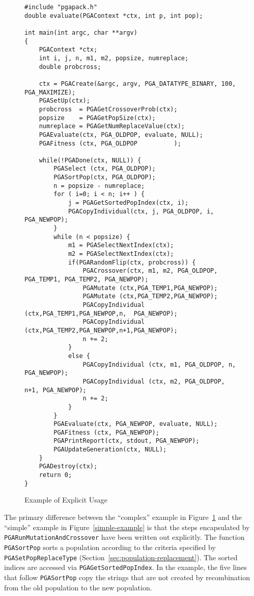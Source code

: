 \documentclass{report}
\begin{document}
\begin{figure}
\begin{verbatim}
#include "pgapack.h"
double evaluate(PGAContext *ctx, int p, int pop);

int main(int argc, char **argv)
{
    PGAContext *ctx; 
    int i, j, n, m1, m2, popsize, numreplace;
    double probcross;

    ctx = PGACreate(&argc, argv, PGA_DATATYPE_BINARY, 100, PGA_MAXIMIZE);
    PGASetUp(ctx);
    probcross  = PGAGetCrossoverProb(ctx);
    popsize    = PGAGetPopSize(ctx);
    numreplace = PGAGetNumReplaceValue(ctx);
    PGAEvaluate(ctx, PGA_OLDPOP, evaluate, NULL);
    PGAFitness (ctx, PGA_OLDPOP          );
    
    while(!PGADone(ctx, NULL)) {
        PGASelect (ctx, PGA_OLDPOP);
        PGASortPop(ctx, PGA_OLDPOP);
        n = popsize - numreplace;
        for ( i=0; i < n; i++ ) {
            j = PGAGetSortedPopIndex(ctx, i);
            PGACopyIndividual(ctx, j, PGA_OLDPOP, i, PGA_NEWPOP);
        }
        while (n < popsize) { 
            m1 = PGASelectNextIndex(ctx);
            m2 = PGASelectNextIndex(ctx);        
            if(PGARandomFlip(ctx, probcross)) {
                PGACrossover(ctx, m1, m2, PGA_OLDPOP, PGA_TEMP1, PGA_TEMP2, PGA_NEWPOP);
                PGAMutate (ctx,PGA_TEMP1,PGA_NEWPOP);
                PGAMutate (ctx,PGA_TEMP2,PGA_NEWPOP);
                PGACopyIndividual (ctx,PGA_TEMP1,PGA_NEWPOP,n,  PGA_NEWPOP);
                PGACopyIndividual (ctx,PGA_TEMP2,PGA_NEWPOP,n+1,PGA_NEWPOP);
                n += 2;
            }
            else {
                PGACopyIndividual (ctx, m1, PGA_OLDPOP, n,   PGA_NEWPOP);
                PGACopyIndividual (ctx, m2, PGA_OLDPOP, n+1, PGA_NEWPOP);
                n += 2;
            }
        }
        PGAEvaluate(ctx, PGA_NEWPOP, evaluate, NULL);
        PGAFitness (ctx, PGA_NEWPOP);
        PGAPrintReport(ctx, stdout, PGA_NEWPOP);
        PGAUpdateGeneration(ctx, NULL);
    }
    PGADestroy(ctx);
    return 0;
}
\end{verbatim}
\caption{Example of Explicit Usage}
\label{complex-example}
\end{figure}

The primary difference between the ``complex'' example in
Figure~\ref{complex-example} and the ``simple'' example in
Figure~\ref{simple-example} is that the steps encapsulated by {\tt
PGARunMutationAndCrossover} have been written out explicitly.  The function
{\tt PGASortPop} sorts a population according to the criteria specified by
{\tt PGASetPopReplaceType} (Section~\ref{sec:population-replacement}).
The sorted indices are accessed via {\tt PGAGetSortedPopIndex}.  In the
example, the five lines that follow {\tt PGASortPop} copy the strings that are
not created by recombination from the old population to the new population.
\end{document}
